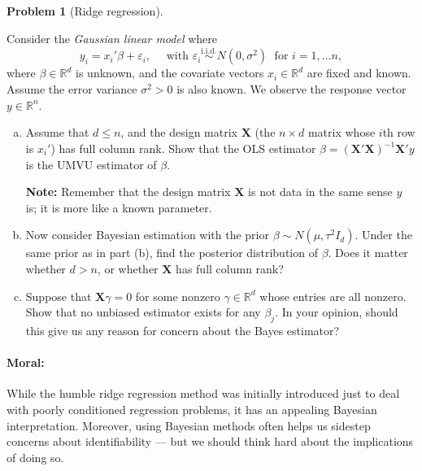 \documentclass{article}
\newcommand{\RR}{\mathbb{R}}
\newcommand{\simiid}{\overset{\text{i.i.d.}}{\sim}}
\newcommand{\ep}{\varepsilon}
\theoremstyle{definition}
\newtheorem{problem}{Problem}
\begin{document}
\begin{problem}[Ridge regression]
\label{prob:ridge-bayes}

Consider the {\em Gaussian linear model} where
\[
y_i = x_i' \beta + \ep_i, \quad \text{ with } \ep_i \simiid N(0,\sigma^2) \;\text{ for } i =1, \ldots n,
\]
where $\beta \in \RR^d$ is unknown, and the covariate vectors $x_i \in \RR^d$ are fixed and known. Assume the error variance $\sigma^2>0$ is also known. We observe the response vector $y \in \RR^n$.
\begin{enumerate}[(a)]
\item Assume that $d \leq n$, and the design matrix $\mathbf{X}$ (the $n \times d$ matrix whose $i$th row is $x_i'$) has full column rank. Show that the OLS estimator $\hat\beta = (\mathbf{X}'\mathbf{X})^{-1}\mathbf{X}'y$ is the UMVU estimator of $\beta$. 

{\bf Note:} Remember that the design matrix $\mathbf{X}$ is not data in the same sense $y$ is; it is more like a known parameter.




\item Now consider Bayesian estimation with the prior $\beta \sim N(\mu, \tau^2 I_d)$.  Under the same prior as in part (b), find the posterior distribution of $\beta$. Does it matter whether $d > n$, or whether $\mathbf{X}$ has full column rank?






\item Suppose that $\mathbf{X}\gamma = 0$ for some nonzero $\gamma \in \RR^d$ whose entries are all nonzero. Show that no unbiased estimator exists for any $\beta_j$. In your opinion, should this give us any reason for concern about the Bayes estimator?



\end{enumerate}

\paragraph{Moral:} While the humble ridge regression method was initially introduced just to deal with poorly conditioned regression problems, it has an appealing Bayesian interpretation. Moreover, using Bayesian methods often helps us sidestep concerns about identifiability --- but we should think hard about the implications of doing so.


\end{problem}
\end{document}
